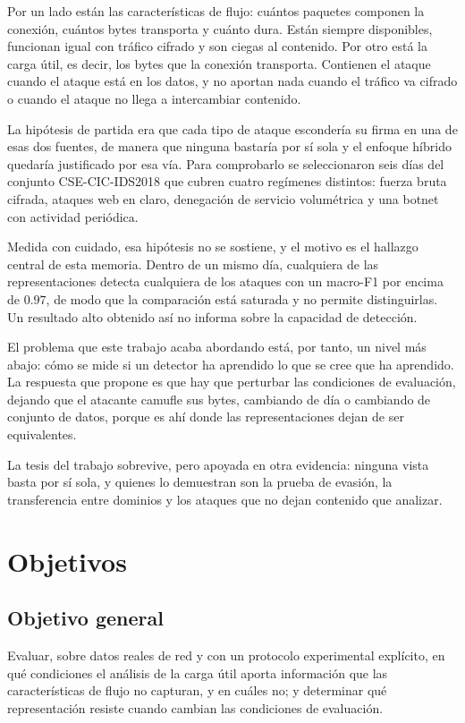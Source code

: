 Por un lado están las características de flujo: cuántos paquetes componen la
conexión, cuántos bytes transporta y cuánto dura. Están siempre disponibles,
funcionan igual con tráfico cifrado y son ciegas al contenido. Por otro está la
carga útil, es decir, los bytes que la conexión transporta. Contienen el ataque
cuando el ataque está en los datos, y no aportan nada cuando el tráfico va
cifrado o cuando el ataque no llega a intercambiar contenido.

La hipótesis de partida era que cada tipo de ataque escondería su firma en una
de esas dos fuentes, de manera que ninguna bastaría por sí sola y el enfoque
híbrido quedaría justificado por esa vía. Para comprobarlo se seleccionaron seis
días del conjunto CSE-CIC-IDS2018 que cubren cuatro regímenes distintos: fuerza
bruta cifrada, ataques web en claro, denegación de servicio volumétrica y una
botnet con actividad periódica.

Medida con cuidado, esa hipótesis no se sostiene, y el motivo es el hallazgo
central de esta memoria. Dentro de un mismo día, cualquiera de las
representaciones detecta cualquiera de los ataques con un macro-F1 por encima de
$0.97$, de modo que la comparación está saturada y no permite distinguirlas.
Un resultado alto obtenido así no informa sobre la capacidad de detección.

El problema que este trabajo acaba abordando está, por tanto, un nivel más
abajo: cómo se mide si un detector ha aprendido lo que se cree que ha aprendido.
La respuesta que propone es que hay que perturbar las condiciones de evaluación,
dejando que el atacante camufle sus bytes, cambiando de día o cambiando de
conjunto de datos, porque es ahí donde las representaciones dejan de ser
equivalentes.

La tesis del trabajo sobrevive, pero apoyada en otra evidencia: ninguna vista
basta por sí sola, y quienes lo demuestran son la prueba de evasión, la
transferencia entre dominios y los ataques que no dejan contenido que analizar.

\section{Objetivos}
\label{sec:objetivos}

\subsection{Objetivo general}

Evaluar, sobre datos reales de red y con un protocolo experimental explícito, en
qué condiciones el análisis de la carga útil aporta información que las
características de flujo no capturan, y en cuáles no; y determinar qué
representación resiste cuando cambian las condiciones de evaluación.

